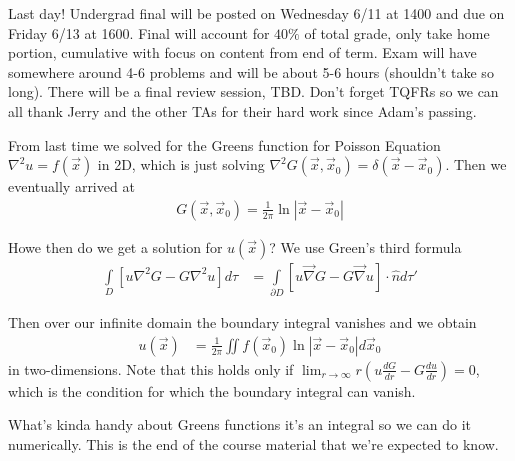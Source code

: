\documentclass[10pt]{report}
\newcommand{\rd}[2]{\frac{d#1}{d#2}}
\newcommand{\abs}[1]{\left|#1\right|}
\begin{document}
Last day! Undergrad final will be posted on Wednesday 6/11 at 1400 and due on Friday 6/13 at 1600. Final will account for $40\%$ of total grade, only take home portion, cumulative with focus on content from end of term. Exam will have somewhere around 4-6 problems and will be about 5-6 hours (shouldn't take so long). There will be a final review session, TBD. Don't forget TQFRs so we can all thank Jerry and the other TAs for their hard work since Adam's passing. 

From last time we solved for the Greens function for Poisson Equation $\nabla^2 u = f(\vec{x})$ in 2D, which is just solving $\nabla^2 G(\vec{x}, \vec{x}_0) = \delta(\vec{x} - \vec{x}_0)$. Then we eventually arrived at
\begin{align}
    G(\vec{x}, \vec{x}_0) = \frac{1}{2\pi}\ln \abs{\vec{x} - \vec{x}_0}
\end{align}

Howe then do we get a solution for $u(\vec{x})$? We use Green's third formula
\begin{align}
    \int\limits_D \left[ u \nabla^2G - G\nabla^2u \right]d\tau &= \int\limits_{\partial D} \left[ u\vec{\nabla} G - G\vec{\nabla}u \right]\cdot \hat{n}d\tau'
\end{align}

Then over our infinite domain the boundary integral vanishes and we obtain
\begin{align}
    u(\vec{x}) &= \frac{1}{2\pi}\iint f(\vec{x}_0) \ln \abs{\vec{x} - \vec{x}_0}d\vec{x}_0
\end{align}
in two-dimensions. Note that this holds only if $\lim_{r \to \infty}r\left( u \rd{G}{r} - G\rd{u}{r} \right) = 0$, which is the condition for which the boundary integral can vanish. 

What's kinda handy about Greens functions it's an integral so we can do it numerically. This is the end of the course material that we're expected to know.
\end{document}
